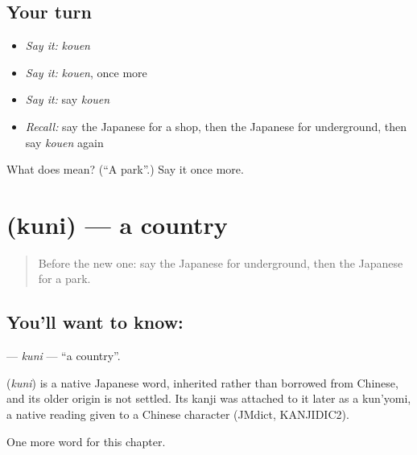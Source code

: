 \subsection*{Your turn}
\begin{itemize}
\raggedright
  \item \emph{Say it:} \emph{kouen}
  \item \emph{Say it:} \emph{kouen}, once more
  \item \emph{Say it:} say \emph{kouen}
  \item \emph{Recall:} say the Japanese for a shop, then the Japanese for underground, then say \emph{kouen} again
\end{itemize}

\begin{tcolorbox}[breakable,colback=teal!4,colframe=teal!35!black,title={Before you move on}]
What does  mean? (\textquotedblleft{}A park\textquotedblright{}.) Say it once more.
\end{tcolorbox}
\section[\texorpdfstring{\ja{くに} (kuni)}{くに (kuni)}]{ (kuni) — a country}

\label{lesson:JA-C58-kuni}



\begin{quote}
Before the new one: say the Japanese for underground, then the Japanese for a park.
\end{quote}

\subsection*{You'll want to know: }
\textbf{} — \emph{kuni} — \textquotedblleft{}a country\textquotedblright{}.

\begin{cousinweb}
\textbf{} (\emph{kuni}) is a native Japanese word, inherited rather than borrowed from Chinese, and its older origin is not settled. Its kanji was attached to it later as a kun'yomi, a native reading given to a Chinese character (JMdict, KANJIDIC2).
\end{cousinweb}

\begin{grammarlens}[title={What you've built}]
One more word for this chapter.
\end{grammarlens}

